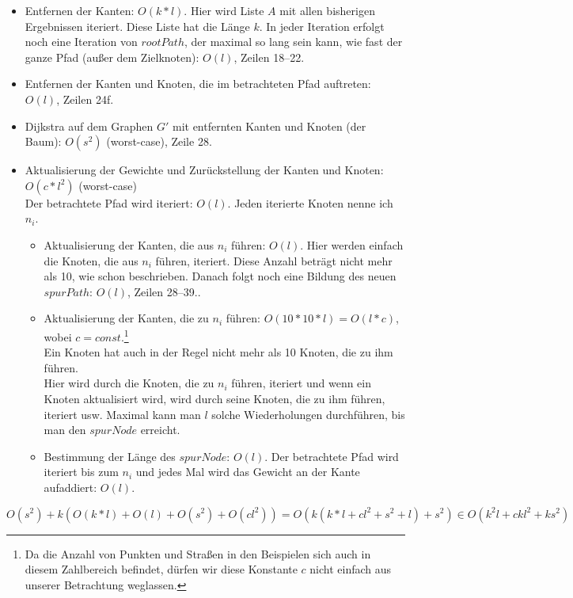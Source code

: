\documentclass[a4paper,10pt,ngerman]{scrartcl}
\begin{document}
\begin{itemize}
  \item Entfernen der Kanten: $O(k * l)$.
  Hier wird Liste $A$ mit allen bisherigen Ergebnissen iteriert. Diese Liste hat die Länge $k$.
  In jeder Iteration erfolgt noch eine Iteration von $rootPath$, der maximal so lang
  sein kann, wie fast der ganze Pfad (außer dem Zielknoten): $O(l)$, Zeilen 18--22.
  \item Entfernen der Kanten und Knoten, die im betrachteten Pfad auftreten: $O(l)$, Zeilen 24f.
  \item Dijkstra auf dem Graphen $G'$ mit entfernten Kanten und Knoten (der Baum): $O(s^2)$ (worst-case), Zeile 28.
  \item Aktualisierung der Gewichte und Zurückstellung der Kanten und Knoten: $O(c*l^2)$ (worst-case)\\
  Der betrachtete Pfad wird iteriert: $O(l)$. Jeden iterierte Knoten nenne ich $n_i$.
  \begin{itemize}
    \item Aktualisierung der Kanten, die aus $n_i$ führen: $O(l)$. Hier werden einfach die Knoten,
    die aus $n_i$ führen, iteriert. Diese Anzahl beträgt nicht mehr als 10, wie schon beschrieben.
    Danach folgt noch eine Bildung des neuen $spurPath$: $O(l)$, Zeilen 28--39..
    \item Aktualisierung der Kanten, die zu $n_i$ führen: $O(10*10*l) = O(l*c)$, wobei $c = const.$\footnote{
    Da die Anzahl von Punkten und Straßen in den Beispielen sich auch in diesem Zahlbereich befindet, dürfen wir
    diese Konstante $c$ nicht einfach aus unserer Betrachtung weglassen.}\\
    Ein Knoten hat auch in der Regel nicht mehr als 10 Knoten, die zu ihm führen.\\
    Hier wird durch die Knoten, die zu $n_i$ führen, iteriert und wenn ein Knoten aktualisiert wird, wird durch seine Knoten,
    die zu ihm führen, iteriert usw. Maximal kann man $l$ solche Wiederholungen durchführen,
    bis man den $spurNode$ erreicht.
    \item Bestimmung der Länge des $spurNode$: $O(l)$. Der betrachtete Pfad wird iteriert bis zum $n_i$
    und jedes Mal wird das Gewicht an der Kante aufaddiert: $O(l)$.
  \end{itemize}
\end{itemize}

$O(s^2) + k(O(k*l) + O(l) +O(s^2) + O(cl^2)) = O(k(k*l + cl^2+ s^2 + l)+s^2) \in O(k^2l + ckl^2 + ks^2)$
\end{document}
